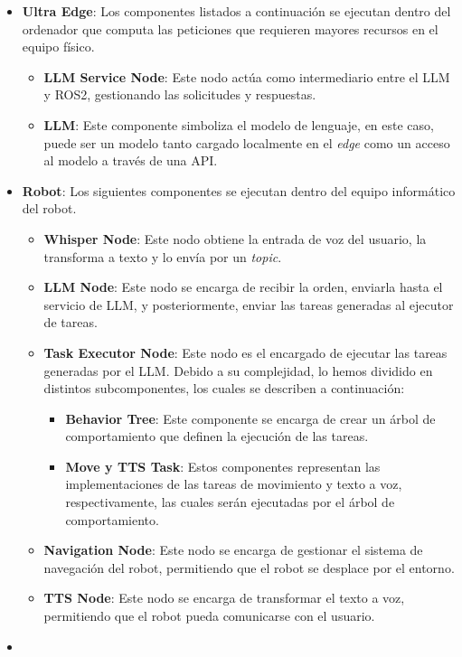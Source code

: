 \documentclass[../main.tex]{subfiles}
\begin{document}
\begin{itemize}
    \item \textbf{Ultra Edge}: Los componentes listados a continuación se ejecutan dentro del ordenador que computa las peticiones que requieren mayores recursos en el equipo físico.

    \begin{itemize}
        \item \textbf{LLM Service Node}: Este nodo actúa como intermediario entre el LLM y ROS2, gestionando las solicitudes y respuestas.
        \item \textbf{LLM}: Este componente simboliza el modelo de lenguaje, en este caso, puede ser un modelo tanto cargado localmente en el \textit{edge} como un acceso al modelo a través de una API.
    \end{itemize}

    \item \textbf{Robot}: Los siguientes componentes se ejecutan dentro del equipo informático del robot.
    \begin{itemize}
        \item \textbf{Whisper Node}: Este nodo obtiene la entrada de voz del usuario, la transforma a texto y lo envía por un \textit{topic}.
        \item \textbf{LLM Node}: Este nodo se encarga de recibir la orden, enviarla hasta el servicio de LLM, y posteriormente, enviar las tareas generadas al ejecutor de tareas.
        \item \textbf{Task Executor Node}: Este nodo es el encargado de ejecutar las tareas generadas por el LLM. Debido a su complejidad, lo hemos dividido en distintos subcomponentes, los cuales se describen a continuación:
        \begin{itemize}
            \item \textbf{Behavior Tree}: Este componente se encarga de crear un árbol de comportamiento que definen la ejecución de las tareas.
            \item \textbf{Move y TTS Task}: Estos componentes representan las implementaciones de las tareas de movimiento y texto a voz, respectivamente, las cuales serán ejecutadas por el árbol de comportamiento.
        \end{itemize}
        \item \textbf{Navigation Node}: Este nodo se encarga de gestionar el sistema de navegación del robot, permitiendo que el robot se desplace por el entorno.
        \item \textbf{TTS Node}: Este nodo se encarga de transformar el texto a voz, permitiendo que el robot pueda comunicarse con el usuario.
    \end{itemize}

    \item \textbf{}
\end{itemize}
\end{document}
